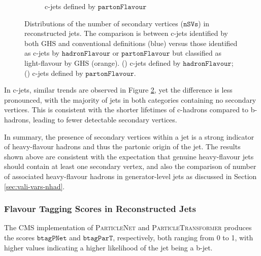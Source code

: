 \documentclass[10pt,twocolumn]{article}
\newcommand*{\parFlav}{\texttt{partonFlavour}}
\newcommand*{\hadFlav}{\texttt{hadronFlavour}}
\begin{document}
\begin{figure}[!htbp]
\begin{subfigure}[t]{0.48\textwidth}
        \caption{c-jets defined by $\parFlav$}
        \label{fig:jet_nSVs_full_c_parton_c}
    \end{subfigure}
    \caption{Distributions of the number of secondary vertices ($\texttt{nSVs}$) in reconstructed jets. The comparison is between c-jets identified by both GHS and conventional definitions (blue) versus those identified as c-jets by $\hadFlav$ or $\parFlav$ but classified as light-flavour by GHS (orange). () c-jets defined by $\hadFlav$; () c-jets defined by $\parFlav$.}
    \label{fig:jet_nSVs_full_c}
\end{figure}

In c-jets, similar trends are observed in Figure \ref{fig:jet_nSVs_full_c}, yet the difference is less pronounced, with the majority of jets in both categories containing no secondary vertices. This is consistent with the shorter lifetimes of c-hadrons compared to b-hadrons, leading to fewer detectable secondary vertices.

In summary, the presence of secondary vertices within a jet is a strong indicator of heavy-flavour hadrons and thus the partonic origin of the jet. The results shown above are consistent with the expectation that genuine heavy-flavour jets should contain at least one secondary vertex, and also the comparison of number of associated heavy-flavour hadrons in generator-level jets as discussed in Section \ref{sec:vali-vars-nhad}.

\subsubsection{Flavour Tagging Scores in Reconstructed Jets}
\label{sec:vali-vars-ml}

The CMS implementation of \textsc{ParticleNet} \cite{quParticleNetJetTagging2020} and \textsc{ParticleTransformer} \cite{quParticleTransformerJet2024} produces the scores $\texttt{btagPNet}$ and $\texttt{btagParT}$, respectively, both ranging from 0 to 1, with higher values indicating a higher likelihood of the jet being a b-jet.
\end{document}
